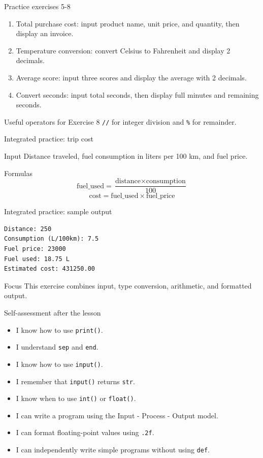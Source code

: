 \documentclass[aspectratio=169,10pt]{beamer}
\begin{document}
\begin{frame}{Practice exercises 5-8}
\begin{enumerate}
  \item Total purchase cost: input product name, unit price, and quantity, then display an invoice.
  \item Temperature conversion: convert Celsius to Fahrenheit and display 2 decimals.
  \item Average score: input three scores and display the average with 2 decimals.
  \item Convert seconds: input total seconds, then display full minutes and remaining seconds.
\end{enumerate}
\begin{block}{Useful operators for Exercise 8}
\texttt{//} for integer division and \texttt{\%} for remainder.
\end{block}
\end{frame}

\begin{frame}{Integrated practice: trip cost}
\begin{block}{Input}
Distance traveled, fuel consumption in liters per 100 km, and fuel price.
\end{block}
\begin{block}{Formulas}
\[
\text{fuel\_used} = \frac{\text{distance} \times \text{consumption}}{100}
\]
\[
\text{cost} = \text{fuel\_used} \times \text{fuel\_price}
\]
\end{block}
\end{frame}

\begin{frame}[fragile]{Integrated practice: sample output}
\begin{verbatim}
Distance: 250
Consumption (L/100km): 7.5
Fuel price: 23000
Fuel used: 18.75 L
Estimated cost: 431250.00
\end{verbatim}
\begin{alertblock}{Focus}
This exercise combines input, type conversion, arithmetic, and formatted output.
\end{alertblock}
\end{frame}

\begin{frame}{Self-assessment after the lesson}
\small
\begin{itemize}
  \item I know how to use \texttt{print()}.
  \item I understand \texttt{sep} and \texttt{end}.
  \item I know how to use \texttt{input()}.
  \item I remember that \texttt{input()} returns \texttt{str}.
  \item I know when to use \texttt{int()} or \texttt{float()}.
  \item I can write a program using the Input - Process - Output model.
  \item I can format floating-point values using \texttt{.2f}.
  \item I can independently write simple programs without using \texttt{def}.
\end{itemize}
\end{frame}
\end{document}
